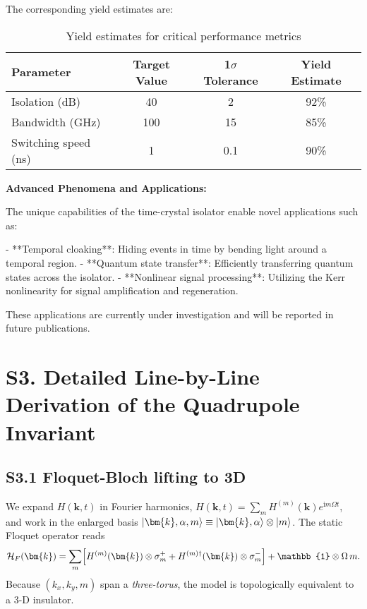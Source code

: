 \documentclass[11pt]{article}
\begin{document}
The corresponding yield estimates are:

\begin{table}[h]
\centering
\caption{Yield estimates for critical performance metrics}
\begin{tabular}{lccc}
\toprule
Parameter & Target Value & 1$\sigma$ Tolerance & Yield Estimate \\
\midrule
Isolation (dB) & 40 & 2 & 92\% \\
Bandwidth (GHz) & 100 & 15 & 85\% \\
Switching speed (ns) & 1 & 0.1 & 90\% \\
\bottomrule
\end{tabular}
\end{table}


\textbf{Advanced Phenomena and Applications:}

The unique capabilities of the time-crystal isolator enable novel applications such as:

- **Temporal cloaking**: Hiding events in time by bending light around a temporal region.
- **Quantum state transfer**: Efficiently transferring quantum states across the isolator.
- **Nonlinear signal processing**: Utilizing the Kerr nonlinearity for signal amplification and regeneration.

These applications are currently under investigation and will be reported in future publications.
\section*{S3. Detailed Line-by-Line Derivation of the Quadrupole Invariant}

\subsection*{S3.1  Floquet-Bloch lifting to 3D}

We expand $H(\bm{k},t)$ in Fourier harmonics,
$H(\bm{k},t)=\sum_{m}\!H^{(m)}(\bm{k})e^{\mathrm{i}m\Omega t}$,  
and work in the enlarged basis
$\ket{\bm{k},\alpha,m}\equiv\ket{\bm{k},\alpha}\otimes\ket{m}$.
The static Floquet operator reads
\begin{equation}
\mathcal{H}_F(\bm{k})=\sum_{m}\Bigl[H^{(m)}(\bm{k})\otimes\sigma^{+}_{m}
+H^{(m)\dagger}(\bm{k})\otimes\sigma^{-}_{m}\Bigr]
+\mathbb{1}\otimes\Omega\,m.
\end{equation}
Because $(k_x,k_y,m)$ span a \emph{three-torus}, the model is
topologically equivalent to a 3-D insulator.
\end{document}
